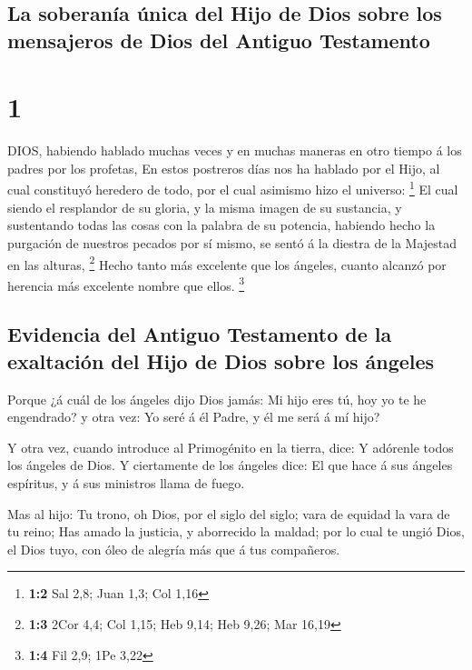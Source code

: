 \hypertarget{la-soberanuxeda-uxfanica-del-hijo-de-dios-sobre-los-mensajeros-de-dios-del-antiguo-testamento}{%
\subsection{La soberanía única del Hijo de Dios sobre los mensajeros de
Dios del Antiguo
Testamento}\label{la-soberanuxeda-uxfanica-del-hijo-de-dios-sobre-los-mensajeros-de-dios-del-antiguo-testamento}}

\hypertarget{section}{%
\section{1}\label{section}}

 DIOS, habiendo hablado muchas veces y en muchas maneras en
otro tiempo á los padres por los profetas,  En estos
postreros días nos ha hablado por el Hijo, al cual constituyó heredero
de todo, por el cual asimismo hizo el universo: \footnote{\textbf{1:2}
  Sal 2,8; Juan 1,3; Col 1,16}  El cual siendo el resplandor
de su gloria, y la misma imagen de su sustancia, y sustentando todas las
cosas con la palabra de su potencia, habiendo hecho la purgación de
nuestros pecados por sí mismo, se sentó á la diestra de la Majestad en
las alturas, \footnote{\textbf{1:3} 2Cor 4,4; Col 1,15; Heb 9,14; Heb
  9,26; Mar 16,19}  Hecho tanto más excelente que los
ángeles, cuanto alcanzó por herencia más excelente nombre que ellos.
\footnote{\textbf{1:4} Fil 2,9; 1Pe 3,22}

\hypertarget{evidencia-del-antiguo-testamento-de-la-exaltaciuxf3n-del-hijo-de-dios-sobre-los-uxe1ngeles}{%
\subsection{Evidencia del Antiguo Testamento de la exaltación del Hijo
de Dios sobre los
ángeles}\label{evidencia-del-antiguo-testamento-de-la-exaltaciuxf3n-del-hijo-de-dios-sobre-los-uxe1ngeles}}

 Porque ¿á cuál de los ángeles dijo Dios jamás: Mi hijo eres
tú, hoy yo te he engendrado? y otra vez: Yo seré á él Padre, y él me
será á mí hijo?

 Y otra vez, cuando introduce al Primogénito en la tierra,
dice: Y adórenle todos los ángeles de Dios.  Y ciertamente
de los ángeles dice: El que hace á sus ángeles espíritus, y á sus
ministros llama de fuego.

 Mas al hijo: Tu trono, oh Dios, por el siglo del siglo;
vara de equidad la vara de tu reino;  Has amado la justicia,
y aborrecido la maldad; por lo cual te ungió Dios, el Dios tuyo, con
óleo de alegría más que á tus compañeros.

